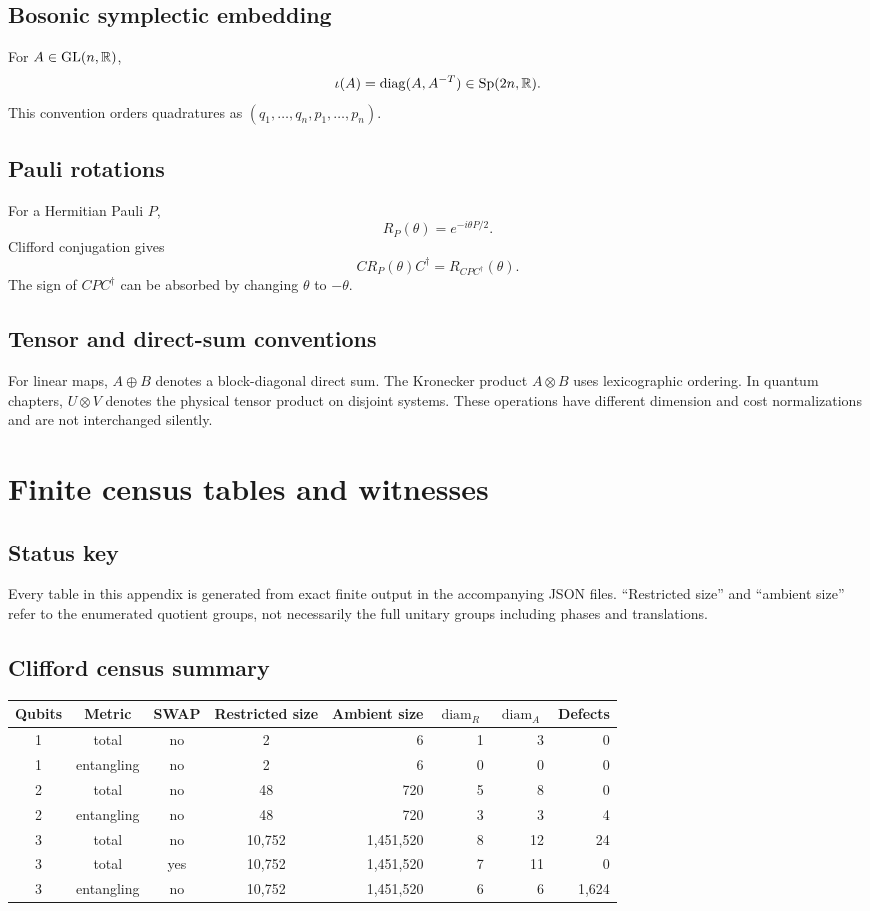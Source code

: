 \subsection{Bosonic symplectic embedding}
For $A\in\operatorname{GL}(n,\mathbb R)$,
\[
\iota(A)=\operatorname{diag}(A,A^{-T})\in\operatorname{Sp}(2n,\mathbb R).
\]
This convention orders quadratures as $(q_1,\ldots,q_n,p_1,\ldots,p_n)$.

\subsection{Pauli rotations}
For a Hermitian Pauli $P$,
\[
R_P(\theta)=e^{-i\theta P/2}.
\]
Clifford conjugation gives
\[
C R_P(\theta) C^\dagger=R_{CPC^\dagger}(\theta).
\]
The sign of $CPC^\dagger$ can be absorbed by changing $\theta$ to $-\theta$.

\subsection{Tensor and direct-sum conventions}
For linear maps, $A\oplus B$ denotes a block-diagonal direct sum.  The Kronecker product $A\otimes B$ uses lexicographic ordering.  In quantum chapters, $U\otimes V$ denotes the physical tensor product on disjoint systems.  These operations have different dimension and cost normalizations and are not interchanged silently.

\section{Finite census tables and witnesses}\label{g:app:census}


\subsection{Status key}
Every table in this appendix is generated from exact finite output in the accompanying JSON files.  ``Restricted size'' and ``ambient size'' refer to the enumerated quotient groups, not necessarily the full unitary groups including phases and translations.

\subsection{Clifford census summary}
\begin{longtable}{@{}ccccrrrr@{}}
\toprule
Qubits & Metric & SWAP & Restricted size & Ambient size & $\operatorname{diam}_R$ & $\operatorname{diam}_A$ & Defects\\
\midrule
1 & total & no & 2 & 6 & 1 & 3 & 0\\
1 & entangling & no & 2 & 6 & 0 & 0 & 0\\
2 & total & no & 48 & 720 & 5 & 8 & 0\\
2 & entangling & no & 48 & 720 & 3 & 3 & 4\\
3 & total & no & 10,752 & 1,451,520 & 8 & 12 & 24\\
3 & total & yes & 10,752 & 1,451,520 & 7 & 11 & 0\\
3 & entangling & no & 10,752 & 1,451,520 & 6 & 6 & 1,624\\
\bottomrule
\end{longtable}

